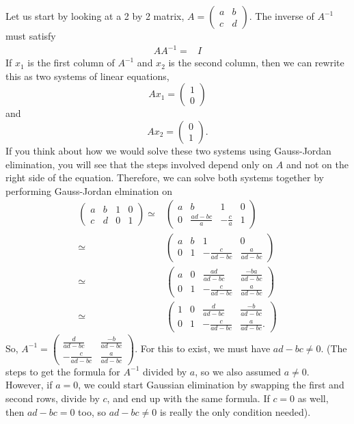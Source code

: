 \documentclass[12pt,reqno]{amsart}
\theoremstyle{definition}
\begin{document}
Let us start by looking at a 2 by 2 matrix, $A = \begin{pmatrix} a & b
  \\ c & d \end{pmatrix}$. The inverse of $A^{-1}$ must satisfy 
\begin{align}
  A A^{-1} = & I
\end{align}
If $x_1$ is the first column of $A^{-1}$ and $x_2$ is the second
column, then we can rewrite this as two systems of linear equations, 
\[ A x_1 = \begin{pmatrix} 1 \\ 0 \end{pmatrix} \]
and 
\[ A x_2 = \begin{pmatrix} 0 \\ 1 \end{pmatrix}. \]
If you think about how we would solve these two systems using
Gauss-Jordan elimination, you will see that the steps involved depend
only on $A$ and not on the right side of the equation. Therefore, we
can solve both systems together by performing Gauss-Jordan elmination
on
\begin{align*}
  \begin{pmatrix} a & b & 1 & 0 \\
    c & d & 0 & 1 
  \end{pmatrix} \simeq & 
  \begin{pmatrix} a & b & 1 & 0 \\
    0 & \frac{ad-bc}{a} & -\frac{c}{a} & 1 
  \end{pmatrix} \\
  \simeq & 
  \begin{pmatrix} a & b & 1 & 0 \\
    0 & 1 & -\frac{c}{ad-bc} & \frac{a}{ad-bc}
  \end{pmatrix} \\
  \simeq & 
  \begin{pmatrix} a & 0 & \frac{ad}{ad-bc} & \frac{-ba}{ad-bc} \\
    0 & 1 & -\frac{c}{ad-bc} & \frac{a}{ad-bc}
  \end{pmatrix} \\
  \simeq & 
  \begin{pmatrix} 1 & 0 & \frac{d}{ad-bc} & \frac{-b}{ad-bc} \\
    0 & 1 & -\frac{c}{ad-bc} & \frac{a}{ad-bc}.
  \end{pmatrix}
\end{align*}
So, $A^{-1} = \begin{pmatrix} \frac{d}{ad-bc} & \frac{-b}{ad-bc} \\
  -\frac{c}{ad-bc} & \frac{a}{ad-bc} \end{pmatrix}$. For this to
exist, we must have $ad - bc \neq 0$. (The steps to get the formula
for $A^{-1}$ divided by $a$, so we also assumed $a \neq 0$. However,
if $a = 0$, we could start Gaussian elimination by swapping the first
and second rows, divide by $c$, and end up with the same formula. If
$c=0$ as well, then $ad - bc = 0$ too, so $ad - bc \neq 0$ is really
the only condition needed). 
\end{document}
